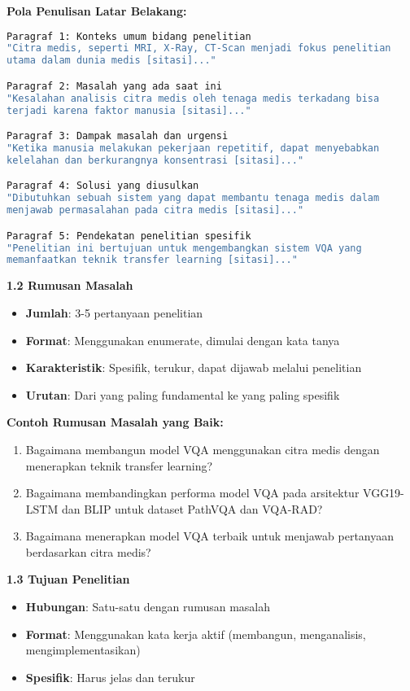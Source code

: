 \textbf{Pola Penulisan Latar Belakang:}
\begin{lstlisting}[language=bash, style=bash, caption=Struktur Latar Belakang]
Paragraf 1: Konteks umum bidang penelitian
"Citra medis, seperti MRI, X-Ray, CT-Scan menjadi fokus penelitian
utama dalam dunia medis [sitasi]..."

Paragraf 2: Masalah yang ada saat ini
"Kesalahan analisis citra medis oleh tenaga medis terkadang bisa
terjadi karena faktor manusia [sitasi]..."

Paragraf 3: Dampak masalah dan urgensi
"Ketika manusia melakukan pekerjaan repetitif, dapat menyebabkan
kelelahan dan berkurangnya konsentrasi [sitasi]..."

Paragraf 4: Solusi yang diusulkan
"Dibutuhkan sebuah sistem yang dapat membantu tenaga medis dalam
menjawab permasalahan pada citra medis [sitasi]..."

Paragraf 5: Pendekatan penelitian spesifik
"Penelitian ini bertujuan untuk mengembangkan sistem VQA yang
memanfaatkan teknik transfer learning [sitasi]..."
\end{lstlisting}

\textbf{1.2 Rumusan Masalah}
\begin{itemize}
    \item \textbf{Jumlah}: 3-5 pertanyaan penelitian
    \item \textbf{Format}: Menggunakan enumerate, dimulai dengan kata tanya
    \item \textbf{Karakteristik}: Spesifik, terukur, dapat dijawab melalui penelitian
    \item \textbf{Urutan}: Dari yang paling fundamental ke yang paling spesifik
\end{itemize}

\textbf{Contoh Rumusan Masalah yang Baik:}
\begin{enumerate}
    \item Bagaimana membangun model VQA menggunakan citra medis dengan menerapkan teknik transfer learning?
    \item Bagaimana membandingkan performa model VQA pada arsitektur VGG19-LSTM dan BLIP untuk dataset PathVQA dan VQA-RAD?
    \item Bagaimana menerapkan model VQA terbaik untuk menjawab pertanyaan berdasarkan citra medis?
\end{enumerate}

\textbf{1.3 Tujuan Penelitian}
\begin{itemize}
    \item \textbf{Hubungan}: Satu-satu dengan rumusan masalah
    \item \textbf{Format}: Menggunakan kata kerja aktif (membangun, menganalisis, mengimplementasikan)
    \item \textbf{Spesifik}: Harus jelas dan terukur
\end{itemize}

